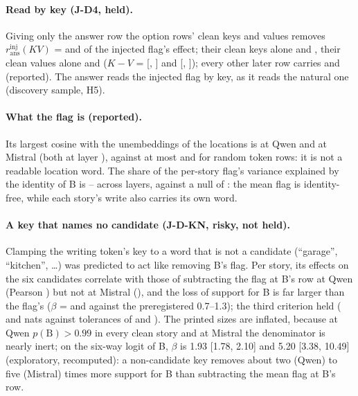 \paragraph{Read by key (J-D4, held).} Giving only the answer row the option rows' clean keys and values removes $r_{\mathrm{ans}}^{\mathrm{inj}}(KV)$ = \JdFourKVQwenSeven{} and \JdFourKVMistralSeven{} of the injected flag's effect; their clean keys alone \JdFourKQwenSeven{} and \JdFourKMistralSeven{}, their clean values alone \JdFourVQwenSeven{} and \JdFourVMistralSeven{} ($K - V$ = \JdFourKmVQwenSeven{} [\JdFourKmVQwenSevenLo{}, \JdFourKmVQwenSevenHi{}] and \JdFourKmVMistralSeven{} [\JdFourKmVMistralSevenLo{}, \JdFourKmVMistralSevenHi{}]); every other later row carries \JdFourOtherQwenSeven{} and \JdFourOtherMistralSeven{} (reported). The answer reads the injected flag by key, as it reads the natural one (discovery sample, H5).

\paragraph{What the flag is (reported).} Its largest cosine with the unembeddings of the locations is \JdLensMaxQwenSeven{} at Qwen and \JdLensMaxMistralSeven{} at Mistral (both at layer \JdLensLayerQwenSeven{}), against at most \JdLensRandMaxQwenSeven{} and \JdLensRandMaxMistralSeven{} for random token rows: it is not a readable location word. The share of the per-story flag's variance explained by the identity of B is \JdBidShareMin{}--\JdBidShareMax{} across layers, against a null of \JdBidShareNull{}: the mean flag is identity-free, while each story's write also carries its own word.

\paragraph{A key that names no candidate (J-D-KN, risky, not held).} Clamping the writing token's key to a word that is not a candidate (``garage'', ``kitchen'', \ldots) was predicted to act like removing B's flag. Per story, its effects on the six candidates correlate with those of subtracting the flag at B's row at Qwen (Pearson \JdKnPearsonQwenSeven{}) but not at Mistral (\JdKnPearsonMistralSeven{}), and the loss of support for B is far larger than the flag's ($\beta$ = \JdKnBetaQwenSeven{} and \JdKnBetaMistralSeven{} against the preregistered 0.7--1.3); the third criterion held (\JdKnDiffQwenSeven{} and \JdKnDiffMistralSeven{} nats against tolerances of \JdKnTolQwenSeven{} and \JdKnTolMistralSeven{}). The printed sizes are inflated, because at Qwen $p(\mathrm{B}) > 0.99$ in every clean story and at Mistral the denominator is nearly inert; on the six-way logit of B, $\beta$ is 1.93 [1.78, 2.10] and 5.20 [3.38, 10.49] (exploratory, recomputed): a non-candidate key removes about two (Qwen) to five (Mistral) times more support for B than subtracting the mean flag at B's row. %

